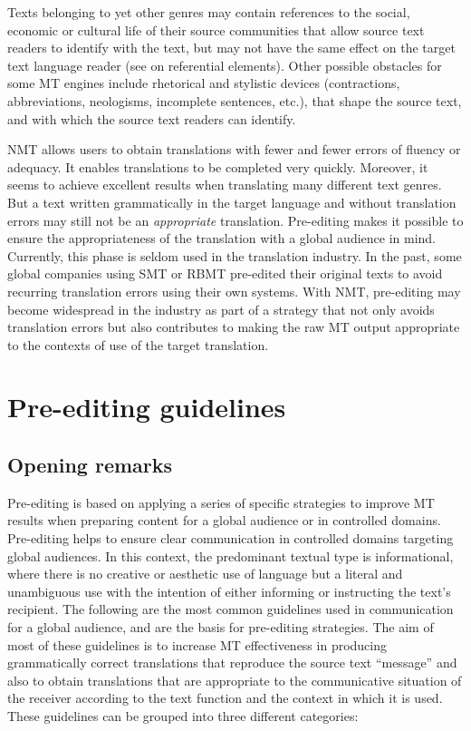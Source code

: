 \documentclass[output=paper,colorlinks,citecolor=brown,
]{langscibook}
\begin{document}
Texts belonging to yet other genres may contain references to the social, economic or cultural life of their source communities that allow source text readers to identify with the text, but may not have the same effect on the target text language reader (see  on referential elements). Other possible obstacles for some MT engines include rhetorical and stylistic devices (contractions, abbreviations, neologisms, incomplete sentences, etc.), that shape the source text, and with which the source text readers can identify.

NMT allows users to obtain translations with fewer and fewer errors of fluency or adequacy. It enables translations to be completed very quickly. Moreover, it seems to achieve excellent results when translating many different text genres. But a text written grammatically in the target language and without translation errors may still not be an \textit{appropriate} translation.  Pre-editing makes it possible to ensure the appropriateness of the translation with a global audience in mind. Currently, this phase is seldom used in the translation industry. In the past, some global companies using SMT or RBMT pre-edited their original texts to avoid recurring translation errors using their own systems. With NMT, pre-editing may become widespread in the industry as part of a strategy that not only avoids translation errors but also contributes to making the raw MT output appropriate to the contexts of use of the target translation.

\section{Pre-editing guidelines}
\subsection{Opening remarks}

Pre-editing is based on applying a series of specific strategies to improve MT results when preparing content for a global audience or in controlled domains. Pre-editing helps to ensure clear communication in controlled domains targeting global audiences. In this context, the predominant textual type is informational, where there is no creative or aesthetic use of language but a literal and unambiguous use with the intention of either informing or instructing the text’s recipient. The following are the most common guidelines used in communication for a global audience, and are the basis for pre-editing strategies. The aim of most of these guidelines is to increase MT effectiveness in producing grammatically correct translations that reproduce the source text “message” and also to obtain translations that are appropriate to the communicative situation of the receiver according to the text function and the context in which it is used. These guidelines can be grouped into three different categories:\largerpage
\end{document}
